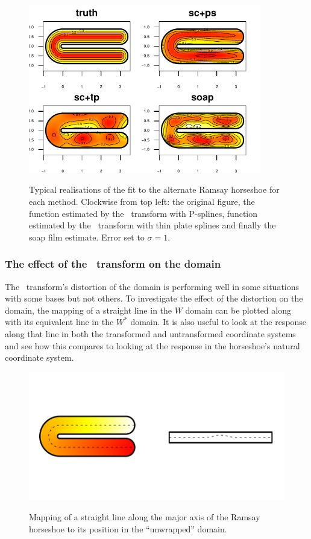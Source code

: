 \begin{figure}
\centering
\includegraphics[width=4in]{sc/figs/altramsaycomp.pdf}\\
\caption{Typical realisations of the fit to the alternate Ramsay horseshoe for each method. Clockwise from top left: the original figure, the function estimated by the \sch\ transform with P-splines, function estimated by the \sch\ transform with thin plate splines and finally the soap film estimate. Error set to $\sigma=1$.}
\label{altramsaycomp}
\end{figure}


\subsubsection{The effect of the \sch\ transform on the domain}

The \sch\ transform's distortion of the domain is performing well in some situations with some bases but not others. To investigate the effect of the distortion on the domain, the mapping of a straight line in the $W$ domain can be plotted along with its equivalent line in the $W^*$ domain. It is also useful to look at the response along that line in both the transformed and untransformed coordinate systems and see how this compares to looking at the response in the horseshoe's natural coordinate system.

\begin{figure}
\centering
\includegraphics[trim=0.5in 1in 0in 1in]{sc/figs/horseshoecentreline.pdf} \\
\caption{Mapping of a straight line along the major axis of the Ramsay horseshoe to its position in the ``unwrapped'' domain.}
\label{horseshoecentreline}
\end{figure}


